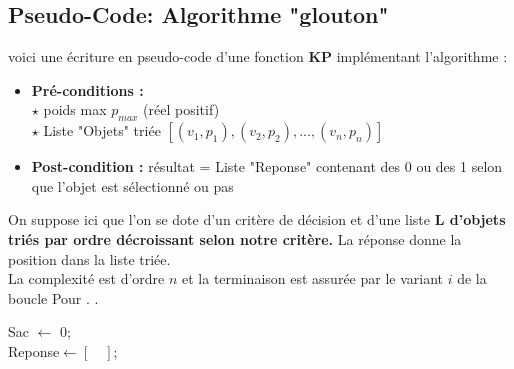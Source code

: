 \documentclass[12pt,french]{article}
\begin{document}
\begin{minipage}{.6\linewidth}
\subsection{Pseudo-Code: Algorithme "glouton"}
voici une écriture en pseudo-code d'une fonction \textbf{KP} implémentant l'algorithme  :
	\begin{itemize}[$\bullet$]
	\item \textbf{Pré-conditions :} \\
	$\star$ poids max $p_{max}$ (réel positif)\\
	$\star$ Liste "Objets" triée $[ (v_1,p_1),(v_2,p_2), ...,(v_n,p_n)  ]$
	\item \textbf{Post-condition :} résultat = Liste "Reponse" contenant des 0 ou des 1 selon que l'objet est sélectionné ou pas 
\end{itemize}
On suppose ici que l'on se dote d'un critère de décision et d'une liste \textbf{L d'objets triés par ordre décroissant selon notre critère.} La réponse donne la position dans la liste triée.\\
La complexité est d'ordre $n$ et la terminaison est assurée par le variant $i$ de la boucle \og Pour \fg.
.\end{minipage}\hfill\begin{minipage}{.3\linewidth}
\begin{algorithm}[H]
	\SetAlgoLined
	
	{Sac $\leftarrow$ 0;\\
		Reponse$\leftarrow [\quad ]$;\\
		}
	
\end{algorithm}
\end{minipage}\\
\end{document}
